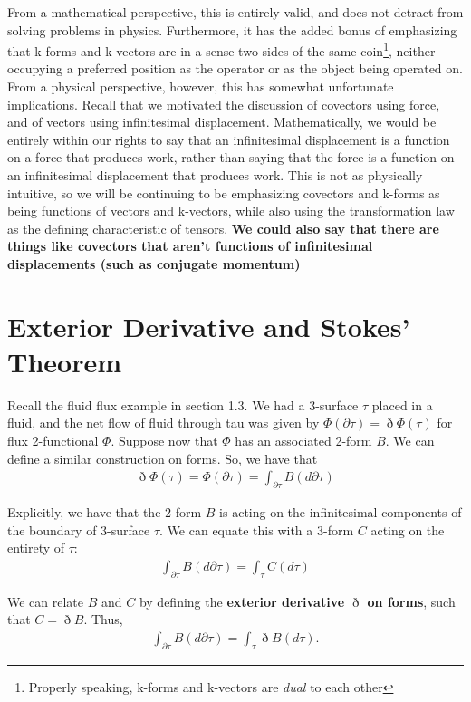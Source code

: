 \documentclass{book}
\begin{document}
From a mathematical perspective, this is entirely valid, and does not detract from solving problems in physics. Furthermore, it has the added bonus of emphasizing that k-forms and k-vectors are in a sense two sides of the same coin\footnote{Properly speaking, k-forms and k-vectors are \emph{dual} to each other}, neither occupying a preferred position as the operator or as the object being operated on. From a physical perspective, however, this has somewhat unfortunate implications. Recall that we motivated the discussion of covectors using force, and of vectors using infinitesimal displacement. Mathematically, we would be entirely within our rights to say that an infinitesimal displacement is a function on a force that produces work, rather than saying that the force is a function on an infinitesimal displacement that produces work. This is not as physically intuitive, so we will be continuing to be emphasizing covectors and k-forms as being functions of vectors and k-vectors, while also using the transformation law as the defining characteristic of tensors.
\textbf{ We could also say that there are things like covectors that aren't functions of infinitesimal displacements (such as conjugate momentum)}


\section{Exterior Derivative and Stokes' Theorem}


Recall the fluid flux example in section 1.3. We had a 3-surface $\tau$ placed in a fluid, and the net flow of fluid through tau was given by $\Phi(\partial\tau) = \eth\Phi(\tau)$ for flux 2-functional $\Phi$. Suppose now that $\Phi$ has an associated 2-form $B$. We can define a similar construction on forms. So, we have that \begin{gather} \eth\Phi(\tau) = \Phi(\partial\tau) = \int_{\partial\tau} B(d\partial\tau) \end{gather}

Explicitly, we have that the 2-form $B$ is acting on the infinitesimal components of the boundary of 3-surface $\tau$. We can equate this with a 3-form $C$ acting on the entirety of $\tau$: \begin{gather} \int_{\partial\tau} B(d\partial\tau) = \int_\tau C(d\tau) \end{gather}

We can relate $B$ and $C$ by defining the \textbf{exterior derivative $\eth$ on forms}, such that $C = \eth B$. Thus, \begin{gather} \int_{\partial\tau} B(d\partial\tau) = \int_\tau \eth B(d\tau). \end{gather}
\end{document}
